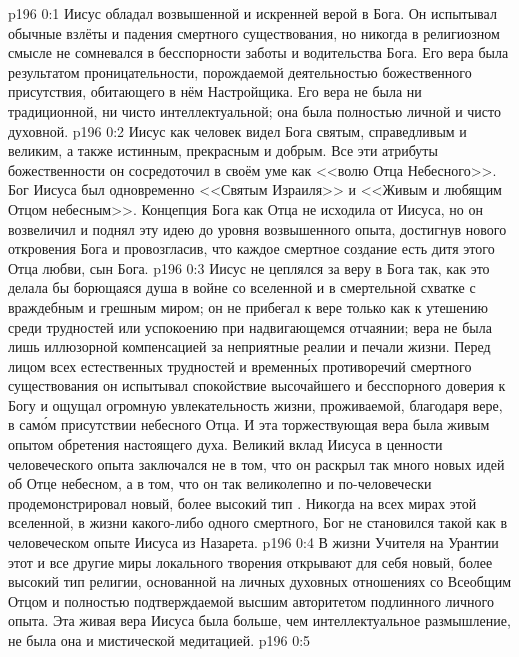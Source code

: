 \author{Промежуточные создания}
\vs p196 0:1 Иисус обладал возвышенной и искренней верой в Бога. Он испытывал обычные взлёты и падения смертного существования, но никогда в религиозном смысле не сомневался в бесспорности заботы и водительства Бога. Его вера была результатом проницательности, порождаемой деятельностью божественного присутствия, обитающего в нём Настройщика. Его вера не была ни традиционной, ни чисто интеллектуальной; она была полностью личной и чисто духовной.
\vs p196 0:2 Иисус как человек видел Бога святым, справедливым и великим, а также истинным, прекрасным и добрым. Все эти атрибуты божественности он сосредоточил в своём уме как <<волю Отца Небесного>>. Бог Иисуса был одновременно <<Святым Израиля>> и <<Живым и любящим Отцом небесным>>. Концепция Бога как Отца не исходила от Иисуса, но он возвеличил и поднял эту идею до уровня возвышенного опыта, достигнув нового откровения Бога и провозгласив, что каждое смертное создание есть дитя этого Отца любви, сын Бога.
\vs p196 0:3 Иисус не цеплялся за веру в Бога так, как это делала бы борющаяся душа в войне со вселенной и в смертельной схватке с враждебным и грешным миром; он не прибегал к вере только как к утешению среди трудностей или успокоению при надвигающемся отчаянии; вера не была лишь иллюзорной компенсацией за неприятные реалии и печали жизни. Перед лицом всех естественных трудностей и временн\'ых противоречий смертного существования он испытывал спокойствие высочайшего и бесспорного доверия к Богу и ощущал огромную увлекательность жизни, проживаемой, благодаря вере, в сам\'ом присутствии небесного Отца. И эта торжествующая вера была живым опытом обретения настоящего духа. Великий вклад Иисуса в ценности человеческого опыта заключался не в том, что он раскрыл так много новых идей об Отце небесном, а в том, что он так великолепно и по\hyp{}человечески продемонстрировал новый, более высокий тип . Никогда на всех мирах этой вселенной, в жизни какого\hyp{}либо одного смертного, Бог не становился такой  как в человеческом опыте Иисуса из Назарета.
\vs p196 0:4 В жизни Учителя на Урантии этот и все другие миры локального творения открывают для себя новый, более высокий тип религии, основанной на личных духовных отношениях со Всеобщим Отцом и полностью подтверждаемой высшим авторитетом подлинного личного опыта. Эта живая вера Иисуса была больше, чем интеллектуальное размышление, не была она и мистической медитацией.
\vs p196 0:5 
